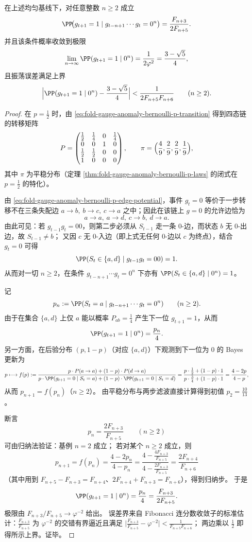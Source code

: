 \begin{theorem}\label{thm:fold-gauge-anomaly-zero-run-fibonacci}
在上述均匀基线下，对任意整数 \(n\ge 2\) 成立
\[
\PP\!\bigl(g_{t+1}=1\mid g_{t-n+1}\cdots g_t=0^n\bigr)
=\frac{F_{n+3}}{2F_{n+5}}.
\]
并且该条件概率收敛到极限
\[
\lim_{n\to\infty}\PP(g_{t+1}=1\mid 0^n)=\frac{1}{2\varphi^2}=\frac{3-\sqrt5}{4},
\]
且振荡误差满足上界
\[
\Bigl|\PP(g_{t+1}=1\mid 0^n)-\frac{3-\sqrt5}{4}\Bigr|
<\frac{1}{2F_{n+5}F_{n+6}}
\qquad(n\ge 2).
\]
\end{theorem}
\begin{proof}
在 \(p=\tfrac12\) 时，由 \eqref{eq:fold-gauge-anomaly-bernoulli-p-transition} 得到四态链的转移矩阵
\[
P=
\begin{pmatrix}
\frac12&\frac14&0&\frac14\\
0&0&1&0\\
\frac12&\frac12&0&0\\
1&0&0&0
\end{pmatrix},
\qquad
\pi=\Bigl(\frac49,\frac29,\frac29,\frac19\Bigr),
\]
其中 \(\pi\) 为平稳分布（定理 \ref{thm:fold-gauge-anomaly-bernoulli-p-laws} 的闭式在 \(p=\tfrac12\) 的特化）。
\par
由 \eqref{eq:fold-gauge-anomaly-bernoulli-p-edge-potential}，事件 \(g_t=0\) 等价于一步转移不在三条失配边
\(
a\to b,\ b\to c,\ c\to a
\)
之中；因此在该链上 \(g=0\) 的允许边恰为
\[
a\to a,\ a\to d,\ c\to b,\ d\to a.
\]
由此可见：若 \(g_{t-1}g_t=00\)，则第二步必须从 \(S_{t-1}\) 走一条 \(0\)-边，而状态 \(b\) 无 \(0\)-出边，故 \(S_{t-1}\neq b\)；
又因 \(c\) 无 \(0\)-入边（即上式无任何 \(0\)-边以 \(c\) 为终点），结合 \(g_t=0\) 可得
\[
\PP(S_t\in\{a,d\}\mid g_{t-1}g_t=00)=1.
\]
从而对一切 \(n\ge 2\)，在条件 \(g_{t-n+1}\cdots g_t=0^n\) 下亦有 \(\PP(S_t\in\{a,d\}\mid 0^n)=1\)。
\par
记
\[
p_n:=\PP(S_t=a\mid g_{t-n+1}\cdots g_t=0^n)\qquad(n\ge 2).
\]
由于在集合 \(\{a,d\}\) 上仅 \(a\) 能以概率 \(P_{ab}=\tfrac14\) 产生下一位 \(g_{t+1}=1\)，从而
\[
\PP(g_{t+1}=1\mid 0^n)=\frac{p_n}{4}.
\]
另一方面，在后验分布 \((p,1-p)\)（对应 \(\{a,d\}\)）下观测到下一位为 \(0\) 的 Bayes 更新为
\[
p\longmapsto f(p)
:=\frac{p\cdot P(a\to a)+(1-p)\cdot P(d\to a)}{p\cdot \PP(g_{t+1}=0\mid S_t=a)+(1-p)\cdot \PP(g_{t+1}=0\mid S_t=d)}
=\frac{p\cdot\frac12+(1-p)\cdot 1}{p\cdot\frac34+(1-p)\cdot 1}
=\frac{4-2p}{4-p},
\]
从而 \(p_{n+1}=f(p_n)\)（\(n\ge 2\)）。
由平稳分布与两步滤波直接计算得到初值 \(p_2=\frac{10}{13}\)。
\par
断言
\[
p_n=\frac{2F_{n+3}}{F_{n+5}}\qquad(n\ge 2)
\]
可由归纳法验证：基例 \(n=2\) 成立；
若对某个 \(n\ge 2\) 成立，则
\[
p_{n+1}=f(p_n)=\frac{4-2p_n}{4-p_n}
=\frac{4-\frac{4F_{n+3}}{F_{n+5}}}{4-\frac{2F_{n+3}}{F_{n+5}}}
=\frac{2F_{n+4}}{F_{n+6}}
\]
（其中用到 \(F_{n+5}-F_{n+3}=F_{n+4}\)、\(2F_{n+4}+F_{n+3}=F_{n+6}\)），得到归纳步。
于是
\[
\PP(g_{t+1}=1\mid 0^n)=\frac{p_n}{4}=\frac{F_{n+3}}{2F_{n+5}}.
\]
极限由 \(F_{n+3}/F_{n+5}\to\varphi^{-2}\) 给出。
误差界来自 Fibonacci 连分数收敛子的标准估计：\(\frac{F_{n+3}}{F_{n+5}}\) 为 \(\varphi^{-2}\) 的交错有界逼近且满足
\(
\bigl|\frac{F_{n+3}}{F_{n+5}}-\varphi^{-2}\bigr|<\frac{1}{F_{n+5}F_{n+6}}
\)；
两边乘以 \(\tfrac12\) 即得所示上界。证毕。
\end{proof}

